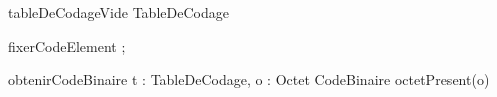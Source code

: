  
\begin{algorithme}

\signaturefonction 
{tableDeCodageVide}
{}
{TableDeCodage}

\signatureprocedure
{fixerCodeElement}
{ ; }


\signatureFonctionAvecPreconditions
{obtenirCodeBinaire}
{t : TableDeCodage, o : Octet}
{CodeBinaire}
{octetPresent(o)}

\end{algorithme}